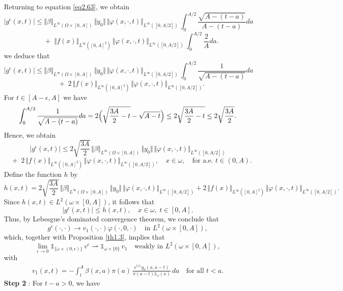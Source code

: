 \documentclass[10pt, a4]{amsart}
\makeatletter
\theoremstyle{plain}
\theoremstyle{definition}
\theoremstyle{remark}
\renewenvironment{proof}[1][\proofname]{\par
  \pushQED{\qed}%
  \normalfont \topsep6\p@\@plus6\p@\relax
  \trivlist
  \item[\hskip\labelsep
        \itshape
    #1\ \ref{#1}.]\ignorespaces
}{%
  \popQED\endtrivlist\@endpefalse
}
\numberwithin{equation}{section}
\def\to{\rightarrow}
\makeatother
\begin{document}
\begin{proof}[of Theorem \ref{th1.4}]
Returning to equation \eqref{eq2.63}, we obtain
\[
\left| g^{\epsilon}(x,t)\right| \leq \Vert \beta\Vert_{L^{\infty}(\Omega\times [0,A])}\,\Vert y_{0}\Vert\,\Vert\varphi(x,\cdot,t)\Vert_{L^{\infty}([0,A/2])}\,\int_0^{A/2}\frac{\sqrt{A-(t-a)}}{A-(t-a)}da
\]
\[
\quad + \; \Vert f(x)\Vert_{L^{\infty}([0,A]^2)}\,\Vert\varphi(x,\cdot,t)\Vert_{L^{\infty}([0,A/2])}\,\int_{0}^{A/2}\frac{2}{A}da.
\]
we deduce that
\[
\left| g^{\epsilon}(x,t)\right| \leq \Vert \beta\Vert_{L^{\infty}(\Omega\times [0,A])}\,\Vert y_{0}\Vert\,\Vert\varphi(x,\cdot,t)\Vert_{L^{\infty}([0,A/2])}\,\int_0^{A/2}\frac{1}{\sqrt{A-(t-a)}}da
\]
\[
\quad + \; 2\,\Vert f(x)\Vert_{L^{\infty}([0,A]^2)}\,\Vert\varphi(x,\cdot,t)\Vert_{L^{\infty}([0,A/2])}.
\]
For \( t\in [A-\epsilon,A] \) we have
\[
\int_0^{A/2}\frac{1}{\sqrt{A-(t-a)}}da=2\Bigl(\sqrt{\frac{3A}{2}-t}-\sqrt{A-t}\Bigr)\leq 2\sqrt{\frac{3A}{2}-t}\leq 2\sqrt{\frac{3A}{2}}.
\]
Hence, we obtain
\[
\left| g^{\epsilon}(x,t)\right| \leq 2\sqrt{\frac{3A}{2}}\,\Vert \beta\Vert_{L^{\infty}(\Omega\times [0,A])}\,\Vert y_{0}\Vert\,\Vert\varphi(x,\cdot,t)\Vert_{L^{\infty}([0,A/2])}
\]
\[
\quad + \; 2\,\Vert f(x)\Vert_{L^{\infty}([0,A]^2)}\,\Vert\varphi(x,\cdot,t)\Vert_{L^{\infty}([0,A/2])},\quad x\in \omega,\quad \text{for a.e. } t\in (0,A).
\]
Define the function \( h \) by
\[
h(x,t)=2\sqrt{\frac{3A}{2}}\,\Vert \beta\Vert_{L^{\infty}(\Omega\times [0,A])}\,\Vert y_{0}\Vert\,\Vert\varphi(x,\cdot,t)\Vert_{L^{\infty}([0,A/2])}
+2\,\Vert f(x)\Vert_{L^{\infty}([0,A]^2)}\,\Vert\varphi(x,\cdot,t)\Vert_{L^{\infty}([0,A/2])}.
\]
Since \( h(x,t)\in L^2(\omega\times[0,A]) \), it follows that
\[
\left| g^{\epsilon}(x,t)\right| \leq h(x,t),\quad x\in \omega,\; t\in [0,A].
\]
Thus, by Lebesgue’s dominated convergence theorem, we conclude that
\[
g^{\epsilon}(\cdot,\cdot) \longrightarrow v_1(\cdot,\cdot)\varphi(\cdot,0,\cdot) \quad \text{in } L^2(\omega\times[0,A]),
\]
which, together with Proposition \ref{th1.3}, implies that
\[
\lim_{\epsilon\to 0}\mathds{1}_{\lbrace\omega\times(0,\epsilon)\rbrace}\,v^{\epsilon} \rightharpoonup \mathds{1}_{\omega\times\lbrace 0\rbrace}\, v_1 \quad \text{weakly in } L^2(\omega\times[0,A]),
\]
with
\begin{align}
    v_1(x,t)= -\int_{t}^A \beta(x,a)\pi(a)\, \frac{e^{t\triangle}y_{0}(x,a-t)}{\pi(a-t)\mathds{1}_{\omega}(x)}\,da \quad \text{for all } t<a.
\end{align}
{\bf Step 2} : For \( t-a>0 \), we have
\begin{align}

\end{align}
\end{proof}
\end{document}
